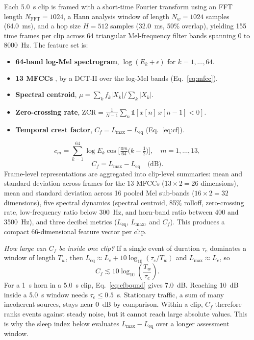 \documentclass[conference]{IEEEtran}
\newcommand{\Leq}{L_{\text{eq}}}
\newcommand{\Lmax}{L_{\max}}
\newcommand{\Cf}{C_f}
\begin{document}
Each 5.0~s clip is framed with a short-time Fourier transform using an FFT length $N_{\text{FFT}} = 1024$, a Hann analysis window of length $N_w = 1024$ samples (64.0~ms), and a hop size $H = 512$ samples (32.0~ms, 50\% overlap), yielding 155 time frames per clip across 64 triangular Mel-frequency filter bands spanning 0 to 8000~Hz. The feature set is:
\begin{itemize}
\item \textbf{64-band log-Mel spectrogram}, $\log(E_k+\epsilon)$ for $k = 1,\dots,64$.
\item \textbf{13 MFCCs} \cite{davis}, by a DCT-II over the log-Mel bands (Eq.~\eqref{eq:mfcc}).
\item \textbf{Spectral centroid}, $\mu=\sum_k f_k|X_k|\big/\sum_k|X_k|$.
\item \textbf{Zero-crossing rate}, $\mathrm{ZCR}=\frac{1}{N-1}\sum_{n}\mathbb 1[x[n]\,x[n-1]<0]$.
\item \textbf{Temporal crest factor}, $\Cf = \Lmax-\Leq$ (Eq.~\eqref{eq:cf}).
\end{itemize}
\begin{equation}
c_m=\sum_{k=1}^{64}\log E_k\cos\!\Big[\tfrac{\pi m}{64}\big(k-\tfrac12\big)\Big],\quad m=1,\dots,13,
\label{eq:mfcc}
\end{equation}
\begin{equation}
\Cf = \Lmax-\Leq\quad\text{(dB)}.
\label{eq:cf}
\end{equation}
Frame-level representations are aggregated into clip-level summaries: mean and standard deviation across frames for the 13 MFCCs ($13\times 2 = 26$ dimensions), mean and standard deviation across 16 pooled Mel sub-bands ($16\times 2 = 32$ dimensions), five spectral dynamics (spectral centroid, 85\% rolloff, zero-crossing rate, low-frequency ratio below 300~Hz, and horn-band ratio between 400 and 3500~Hz), and three decibel metrics ($\Leq$, $\Lmax$, and $\Cf$). This produces a compact 66-dimensional feature vector per clip.

\emph{How large can $\Cf$ be inside one clip?} If a single event of duration $\tau_e$ dominates a window of length $T_w$, then $\Leq\approx L_e+10\log_{10}(\tau_e/T_w)$ and $\Lmax\approx L_e$, so
\begin{equation}
\Cf \lesssim 10\log_{10}\!\left(\frac{T_w}{\tau_e}\right).
\label{eq:cfbound}
\end{equation}
For a 1~s horn in a 5.0~s clip, Eq.~\eqref{eq:cfbound} gives 7.0~dB. Reaching 10~dB inside a 5.0~s window needs $\tau_e\le 0.5$~s. Stationary traffic, a sum of many incoherent sources, stays near 0~dB by comparison. Within a clip, $\Cf$ therefore ranks events against steady noise, but it cannot reach large absolute values. This is why the sleep index below evaluates $\Lmax-\Leq$ over a longer assessment window.
\end{document}
